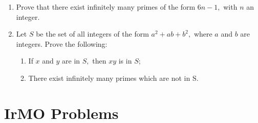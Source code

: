 \documentclass{pset}
\begin{document}
\begin{problems}
    \begin{problem}
    \begin{enumerate}

        \item Prove that there exist infinitely many primes of the form \(6 n-1,\) with \(n\) an integer.
        \item Let \(S\) be the set of all integers of the form \(a^{2}+a b+b^{2},\) where \(a\) and \(b\) are integers. Prove the following:
              \begin{enumerate}

                  \item If \(x\) and \(y\) are in \(S,\) then \(x y\) is in \(S\);
                  \item There exist infinitely many primes which are not in \(\mathrm{S}\).
              \end{enumerate}
    \end{enumerate}
    \end{problem}

\end{problems}

\clearpage

\section*{IrMO Problems}
\end{document}
